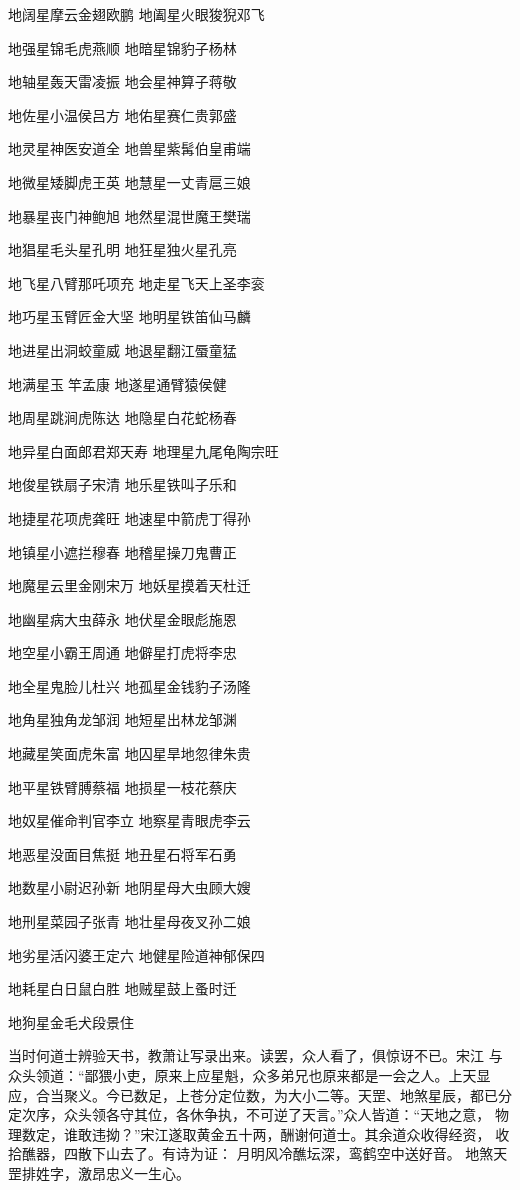 地阔星摩云金翅欧鹏
地阖星火眼狻猊邓飞

地强星锦毛虎燕顺
地暗星锦豹子杨林

地轴星轰天雷凌振
地会星神算子蒋敬

地佐星小温侯吕方
地佑星赛仁贵郭盛

地灵星神医安道全
地兽星紫髯伯皇甫端

地微星矮脚虎王英
地慧星一丈青扈三娘

地暴星丧门神鲍旭
地然星混世魔王樊瑞

地猖星毛头星孔明
地狂星独火星孔亮

地飞星八臂那吒项充
地走星飞天上圣李衮

地巧星玉臂匠金大坚
地明星铁笛仙马麟

地进星出洞蛟童威
地退星翻江蜃童猛

地满星玉竿孟康
地遂星通臂猿侯健

地周星跳涧虎陈达
地隐星白花蛇杨春

地异星白面郎君郑天寿
地理星九尾龟陶宗旺

地俊星铁扇子宋清
地乐星铁叫子乐和

地捷星花项虎龚旺
地速星中箭虎丁得孙

地镇星小遮拦穆春
地稽星操刀鬼曹正

地魔星云里金刚宋万
地妖星摸着天杜迁

地幽星病大虫薛永
地伏星金眼彪施恩

地空星小霸王周通
地僻星打虎将李忠

地全星鬼脸儿杜兴
地孤星金钱豹子汤隆

地角星独角龙邹润
地短星出林龙邹渊

地藏星笑面虎朱富
地囚星旱地忽律朱贵

地平星铁臂膊蔡福
地损星一枝花蔡庆

地奴星催命判官李立
地察星青眼虎李云

地恶星没面目焦挺
地丑星石将军石勇

地数星小尉迟孙新
地阴星母大虫顾大嫂

地刑星菜园子张青
地壮星母夜叉孙二娘

地劣星活闪婆王定六
地健星险道神郁保四

地耗星白日鼠白胜
地贼星鼓上蚤时迁

地狗星金毛犬段景住

当时何道士辨验天书，教萧让写录出来。读罢，众人看了，俱惊讶不已。宋江
与众头领道：“鄙猥小吏，原来上应星魁，众多弟兄也原来都是一会之人。上天显
应，合当聚义。今已数足，上苍分定位数，为大小二等。天罡、地煞星辰，都已分
定次序，众头领各守其位，各休争执，不可逆了天言。”众人皆道：“天地之意，
物理数定，谁敢违拗？”宋江遂取黄金五十两，酬谢何道士。其余道众收得经资，
收拾醮器，四散下山去了。有诗为证：
月明风冷醮坛深，鸾鹤空中送好音。
地煞天罡排姓字，激昂忠义一生心。

